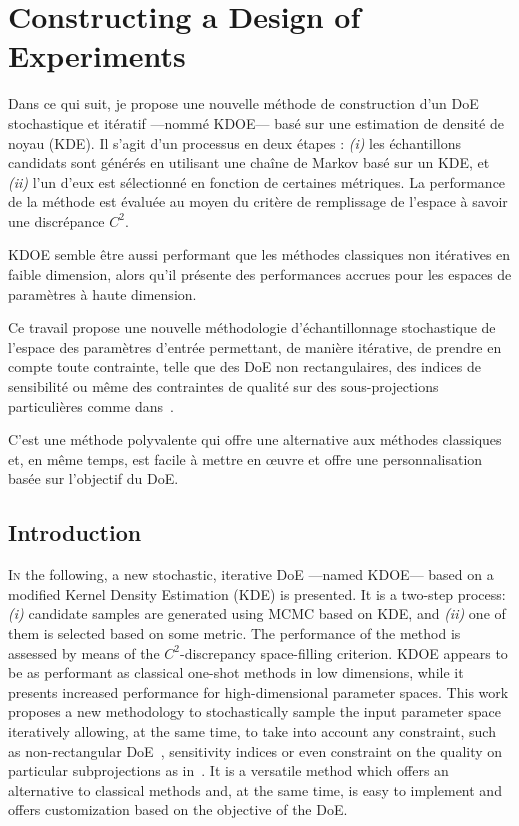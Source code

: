 \chapter{Constructing a Design of Experiments}\label{chap:doe}

\begin{chapquote}
Dans ce qui suit, je propose une nouvelle méthode de construction d'un DoE stochastique et itératif ---\thinspace nommé KDOE\thinspace--- basé sur une estimation de densité de noyau (KDE). Il s'agit d'un processus en deux étapes : \emph{(i)} les échantillons candidats sont générés en utilisant une chaîne de Markov basé sur un KDE, et \emph{(ii)} l'un d'eux est sélectionné en fonction de certaines métriques. La performance de la méthode est évaluée au moyen du critère de remplissage de l'espace à savoir une discrépance $C^2$.

KDOE semble être aussi performant que les méthodes classiques non itératives en faible dimension, alors qu'il présente des performances accrues pour les espaces de paramètres à haute dimension.

Ce travail propose une nouvelle méthodologie d'échantillonnage stochastique de l'espace des paramètres d'entrée permettant, de manière itérative, de prendre en compte toute contrainte, telle que des DoE non rectangulaires, des indices de sensibilité ou même des contraintes de qualité sur des sous-projections particulières comme dans~\citep{Joseph2015}.

C'est une méthode polyvalente qui offre une alternative aux méthodes classiques et, en même temps, est facile à mettre en \oe uvre et offre une personnalisation basée sur l'objectif du DoE.
\end{chapquote}

\section{Introduction}

\lettrine{I}{n} the following, a new stochastic, iterative DoE ---\thinspace named KDOE\thinspace--- based on a modified Kernel Density Estimation (KDE) is presented. It is a two-step process: \emph{(i)} candidate samples are generated using MCMC based on KDE, and \emph{(ii)} one of them is selected based on some metric. The performance of the method is assessed by means of the $C^2$-discrepancy space-filling criterion. KDOE appears to be as performant as classical one-shot methods in low dimensions, while it presents increased performance for high-dimensional parameter spaces. This work proposes a new  methodology to stochastically sample the input parameter space iteratively allowing, at the same time, to take into account any constraint, such as non-rectangular DoE~\citep{Lekivetz2015}, sensitivity indices or even constraint on the quality on particular subprojections as in~\citep{Joseph2015}. It is a versatile method which offers an alternative to classical methods and, at the same time, is easy to implement and offers customization based on the objective of the DoE.

